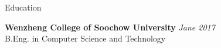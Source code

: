 \documentclass{resume} %
\begin{document}

\begin{rSection}{Education}

  \textbf{Wenzheng College of Soochow University} \hfill \textit{Jane 2017} \\
  B.Eng. in Computer Science and Technology

\end{rSection}

\end{document}
